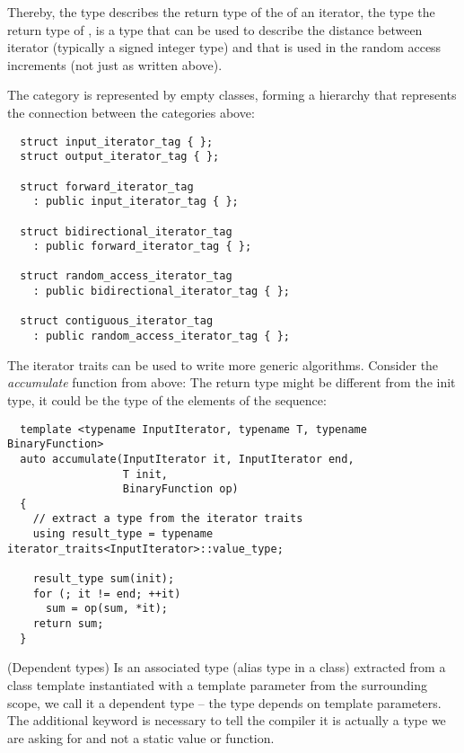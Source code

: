 Thereby, the type  describes the return type of the  of an iterator, the type  the return type of
,  is a type that can be used to describe the distance between iterator (typically a signed integer type)
and that is used in the random access increments (not just  as written above).

The category is represented by empty classes, forming a hierarchy that represents the connection between the categories above:
\begin{verbatim}
  struct input_iterator_tag { };
  struct output_iterator_tag { };

  struct forward_iterator_tag
    : public input_iterator_tag { };

  struct bidirectional_iterator_tag
    : public forward_iterator_tag { };

  struct random_access_iterator_tag
    : public bidirectional_iterator_tag { };

  struct contiguous_iterator_tag
    : public random_access_iterator_tag { };
\end{verbatim}

\begin{example}
  The iterator traits can be used to write more generic algorithms. Consider the \emph{accumulate} function from above:
  The return type might be different from the init type, \eg it could be the type of the elements of the sequence:
  \begin{verbatim}
  template <typename InputIterator, typename T, typename BinaryFunction>
  auto accumulate(InputIterator it, InputIterator end,
                  T init,
                  BinaryFunction op)
  {
    // extract a type from the iterator traits
    using result_type = typename iterator_traits<InputIterator>::value_type;

    result_type sum(init);
    for (; it != end; ++it)
      sum = op(sum, *it);
    return sum;
  }
  \end{verbatim}
\end{example}

\begin{rem}(Dependent types)
  Is an associated type (alias type in a class) extracted from a class template instantiated with a template parameter from the surrounding scope,
  we call it a dependent type -- the type depends on template parameters. The additional keyword  is necessary to tell the compiler
  it is actually a type we are asking for and not a static value or function.
\end{rem}

